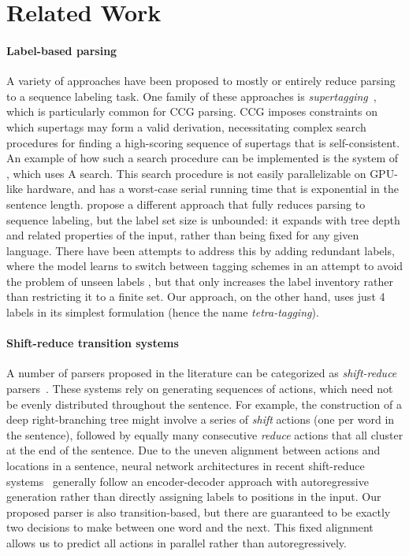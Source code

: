 \documentclass[11pt,a4paper]{article}
\begin{document}
\section{Related Work}

\paragraph{Label-based parsing} A variety of approaches have been proposed to mostly or entirely reduce parsing to a sequence labeling task. One family of these approaches is \emph{supertagging}~\citep{bangalore-joshi-1999-supertagging}, which is particularly common for CCG parsing. CCG imposes constraints on which supertags may form a valid derivation, necessitating complex search procedures for finding a high-scoring sequence of supertags that is self-consistent. An example of how such a search procedure can be implemented is the system of \citet{lee-etal-2016-global}, which uses A search.
This search procedure is not easily parallelizable on GPU-like hardware, and has a worst-case serial running time that is exponential in the sentence length. \citet{gomez-rodriguez-vilares-2018-constituent} propose a different approach that fully reduces parsing to sequence labeling, but the label set size is unbounded: it expands with tree depth and related properties of the input, rather than being fixed for any given language. There have been attempts to address this by adding redundant labels, where the model learns to switch between tagging schemes in an attempt to avoid the problem of unseen labels \citep{vilares-etal-2019-better}, but that only increases the label inventory rather than restricting it to a finite set. Our approach, on the other hand, uses just 4 labels in its simplest formulation (hence the name \emph{tetra-tagging}).

\paragraph{Shift-reduce transition systems} A number of parsers proposed in the literature can be categorized as \emph{shift-reduce} parsers~\citep{henderson-2003-inducing,sagae-lavie-2005-classifier,zhang-clark-2009-transition,zhu-etal-2013-fast}. These systems rely on generating sequences of actions, which need not be evenly distributed throughout the sentence. For example, the construction of a deep right-branching tree might involve a series of \emph{shift} actions (one per word in the sentence), followed by equally many consecutive \emph{reduce} actions that all cluster at the end of the sentence. Due to the uneven alignment between actions and locations in a sentence, neural network architectures in recent shift-reduce systems~\citep{vinyals-etal-2015-grammar,dyer-etal-2016-recurrent,liu-zhang-2017-order} generally follow an encoder-decoder approach with autoregressive generation rather than directly assigning labels to positions in the input. Our proposed parser is also transition-based, but there are guaranteed to be exactly two decisions to make between one word and the next. This fixed alignment allows us to predict all actions in parallel rather than autoregressively.
\end{document}
